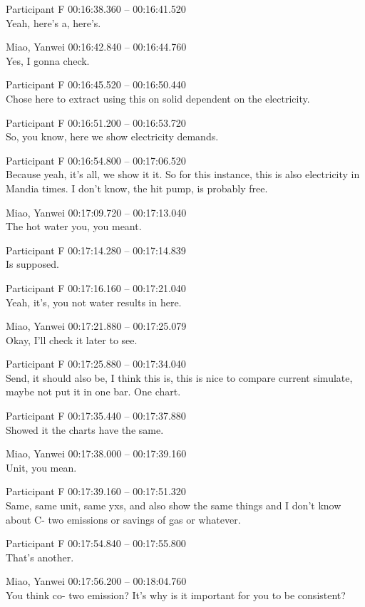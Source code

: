 {Participant F 00:16:38.360 -- 00:16:41.520 \\
Yeah, here's a, here's.

Miao, Yanwei 00:16:42.840 -- 00:16:44.760 \\
Yes, I gonna check.

Participant F 00:16:45.520 -- 00:16:50.440 \\
Chose here to extract using this on solid dependent on the electricity.

Participant F 00:16:51.200 -- 00:16:53.720 \\
So, you know, here we show electricity demands.

Participant F 00:16:54.800 -- 00:17:06.520 \\
Because yeah, it's all, we show it it. So for this instance, this is also electricity in Mandia times. I don't know, the hit pump, is probably free.

Miao, Yanwei 00:17:09.720 -- 00:17:13.040 \\
The hot water you, you meant.

Participant F 00:17:14.280 -- 00:17:14.839 \\
Is supposed.

Participant F 00:17:16.160 -- 00:17:21.040 \\
Yeah, it's, you not water results in here.

Miao, Yanwei 00:17:21.880 -- 00:17:25.079 \\
Okay, I'll check it later to see.

Participant F 00:17:25.880 -- 00:17:34.040 \\
Send, it should also be, I think this is, this is nice to compare current simulate, maybe not put it in one bar. One chart.

Participant F 00:17:35.440 -- 00:17:37.880 \\
Showed it the charts have the same.

Miao, Yanwei 00:17:38.000 -- 00:17:39.160 \\
Unit, you mean.

Participant F 00:17:39.160 -- 00:17:51.320 \\
Same, same unit, same yxs, and also show the same things and I don't know about C- two emissions or savings of gas or whatever.

Participant F 00:17:54.840 -- 00:17:55.800 \\
That's another.

Miao, Yanwei 00:17:56.200 -- 00:18:04.760 \\
You think co- two emission? It's why is it important for you to be consistent?

}
